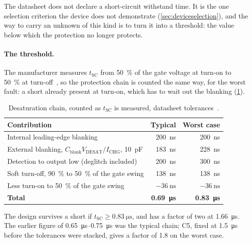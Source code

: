 The \device{} datasheet does not declare a short-circuit withstand
time. It is the one selection criterion the device does not demonstrate
(\cref{sec:deviceselection}), and the way to carry an unknown of this kind is
to turn it into a threshold: the value below which the protection no longer
protects.

\paragraph{The threshold.} The manufacturer measures $t_\mathrm{SC}$ from
\SI{50}{\percent} of the gate voltage at turn-on to \SI{50}{\percent} at
turn-off~\cite{wolfspeed_scan}, so the protection chain is counted the same
way, for the worst fault: a short already present at turn-on, which has to
wait out the blanking (\cref{tab:scchain}).

\begin{table}[htbp]
\centering
\caption{Desaturation chain, counted as $t_\mathrm{SC}$ is measured,
datasheet tolerances~\cite{ti_ucc21750}.}
\label{tab:scchain}
\begin{tabular}{lrr}
\toprule
Contribution & Typical & Worst case \\
\midrule
Internal leading-edge blanking & \SI{200}{\nano\second} & \SI{200}{\nano\second} \\
External blanking, $C_\mathrm{blank}V_\mathrm{DESAT}/I_\mathrm{CHG}$, \SI{10}{\pico\farad}
  & \SI{183}{\nano\second} & \SI{228}{\nano\second} \\
Detection to output low (deglitch included) & \SI{200}{\nano\second} & \SI{300}{\nano\second} \\
Soft turn-off, \SI{90}{\percent} to \SI{50}{\percent} of the gate swing & \SI{138}{\nano\second} & \SI{138}{\nano\second} \\
Less turn-on to \SI{50}{\percent} of the gate swing & $-\SI{36}{\nano\second}$ & $-\SI{36}{\nano\second}$ \\
\midrule
\textbf{Total} & \textbf{\SI{0.69}{\micro\second}} & \textbf{\SI{0.83}{\micro\second}} \\
\bottomrule
\end{tabular}
\end{table}

The design survives a short if $t_\mathrm{SC} \geq
\SI{0.83}{\micro\second}$, and has a factor of two at
\SI{1.66}{\micro\second}. The earlier figure of
\SIrange{0.65}{0.75}{\micro\second} was the typical chain; C5, fixed at
\SI{1.5}{\micro\second} before the tolerances were stacked, gives a factor
of 1.8 on the worst case.

